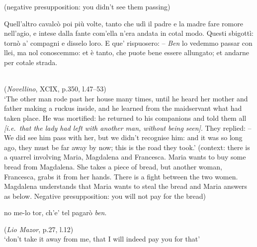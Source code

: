\documentclass[output=paper]{langsci/langscibook}
\begin{document}
\ex \label{ex:schifano:12.10}
	(negative presupposition: you didn’t see them passing)\\
    \begin{otherlanguage}{italian}
    Quell’altro cavalcò poi più volte, tanto che udì il
    padre e la madre fare romore nell’agio, e intese dalla fante com'ella
    n’era andata in cotal modo. Questi sbigottì: tornò a’ compagni e disselo
    loro. E que’ rispuosero: – \textit{Ben} lo vedemmo passar con llei, ma nol
    conoscemmo: et è tanto, che puote bene essere allungato; et andarne per cotale
    strada.
    \end{otherlanguage}\\
	(\emph{Novellino}, XCIX, p.350, l.47--53)\\
    \enquote*{The other man rode past her house many times, until he heard her
    mother and father making a ruckus inside, and he learned from the
    maidservant what had taken place. He was mortified: he returned to his
    companions and told them all \emph{[i.e.\ that the lady had left with
    another man, without being seen]}. They replied: -- We did see him pass
    with her, but we didn’t recognise him: and it was so long ago, they
    must be far away by now; this is the road they took.}
\ex \label{ex:schifano:12.11}
    (context: there is a quarrel involving Maria, Magdalena and Francesca.
    Maria wants to buy some bread from Magdalena. She takes a piece of bread,
    but another woman, Francesca, grabs it from her hands. There is a fight
    between the two women. Magdalena understands that Maria wants to steal the
    bread and Maria answers as below. Negative presupposition: you will not pay
    for the bread)\\
    \begin{otherlanguage}{italian}
    \relax[\dots] no me-lo tor, ch’e’ tel pagarò
    \textit{ben}.
    \end{otherlanguage}\hfill
	(\emph{Lio Mazor}, p.27, l.12)\\
    \enquote*{don’t take it away from me, that I will indeed pay you for that}
\z
\end{document}
